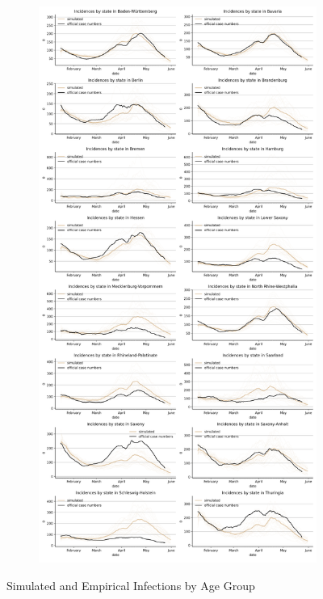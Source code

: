 \begin{figure}[ht]
\begin{subfigure}{.6\textwidth}
  \includegraphics[width=0.9 \textwidth]{../figures/results/figures/incidences_by_group/state/full_spring_baseline_new_known_case}
\end{subfigure}
\caption{Simulated and Empirical Infections by Age Group}
\label{fig:state_fit}
\end{figure}



